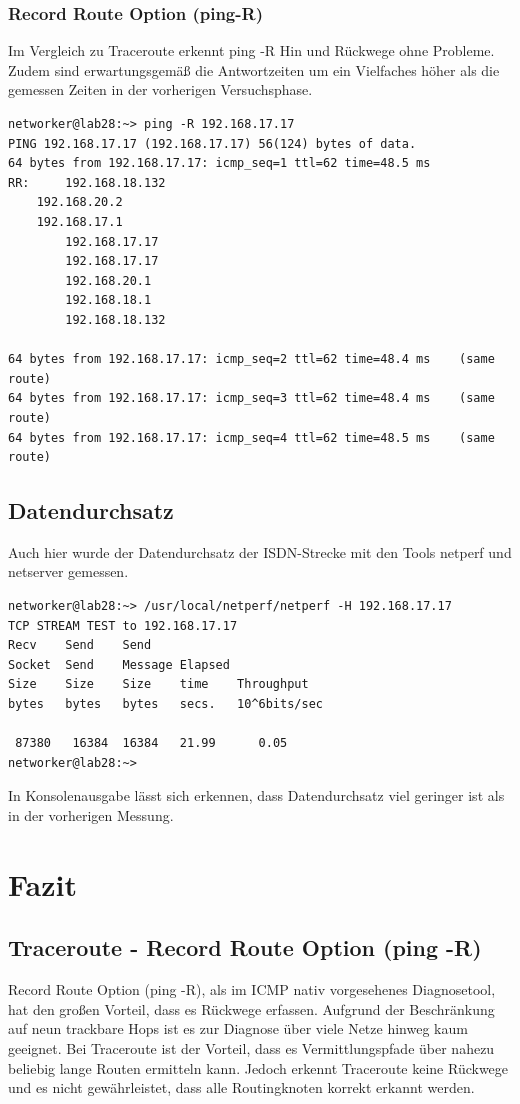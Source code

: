 \subsubsection{Record Route Option (ping-R)}
Im Vergleich zu Traceroute erkennt ping -R Hin und Rückwege ohne Probleme. Zudem sind erwartungsgemäß die Antwortzeiten um ein Vielfaches höher als die gemessen Zeiten in der vorherigen Versuchsphase.
\begin{lstlisting}[label=pingRISDN,caption=ISDN-Strecke ping -R 192.168.17.17]
networker@lab28:~> ping -R 192.168.17.17
PING 192.168.17.17 (192.168.17.17) 56(124) bytes of data.
64 bytes from 192.168.17.17: icmp_seq=1 ttl=62 time=48.5 ms
RR:     192.168.18.132
	192.168.20.2
	192.168.17.1
        192.168.17.17
        192.168.17.17
        192.168.20.1
        192.168.18.1
        192.168.18.132

64 bytes from 192.168.17.17: icmp_seq=2 ttl=62 time=48.4 ms    (same route)
64 bytes from 192.168.17.17: icmp_seq=3 ttl=62 time=48.4 ms    (same route)
64 bytes from 192.168.17.17: icmp_seq=4 ttl=62 time=48.5 ms    (same route) 
\end{lstlisting}
\subsection{Datendurchsatz}
Auch hier wurde der Datendurchsatz der ISDN-Strecke mit den Tools netperf und netserver gemessen.
\begin{lstlisting}[label=netperfISDN,caption=ISDN-Strecke Datendurchsatz]
networker@lab28:~> /usr/local/netperf/netperf -H 192.168.17.17
TCP STREAM TEST to 192.168.17.17
Recv	Send	Send	
Socket	Send	Message	Elapsed
Size	Size	Size	time	Throughput
bytes 	bytes	bytes	secs.	10^6bits/sec

 87380	 16384	16384	21.99	   0.05
networker@lab28:~>
\end{lstlisting}
In Konsolenausgabe lässt sich erkennen, dass Datendurchsatz viel geringer ist als in der vorherigen Messung.
\section{Fazit}
\subsection{Traceroute - Record Route Option (ping -R)}
Record Route Option (ping -R), als im ICMP nativ vorgesehenes Diagnosetool, hat den großen Vorteil, dass es Rückwege erfassen. Aufgrund der Beschränkung auf neun trackbare Hops ist es zur Diagnose über viele Netze hinweg kaum geeignet.
\newline
Bei Traceroute ist der Vorteil, dass es Vermittlungspfade über nahezu beliebig lange Routen ermitteln kann.
Jedoch erkennt Traceroute keine Rückwege und es nicht gewährleistet, dass alle Routingknoten korrekt erkannt werden.
